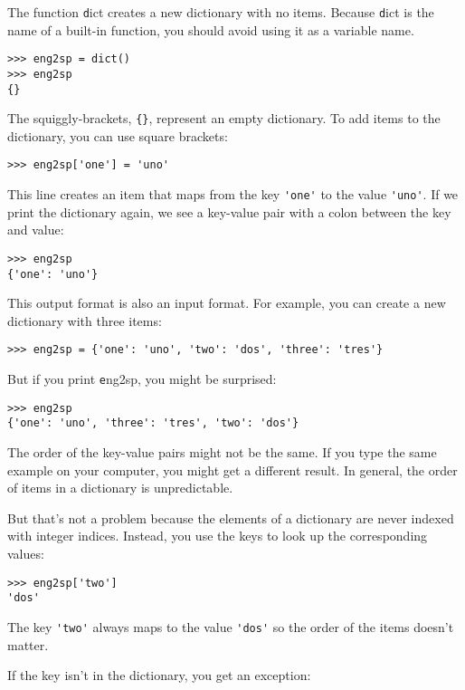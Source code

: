 \documentclass[
DIV=11,
fontsize=13,
twoside,
headinclude=false,
titlepage=firstiscover,
abstract=true,
headsepline=true,
footsepline=true,
chapterprefix=true, %
headings=big,
bibliography=totoc,%
captions=tableheading
]{scrbook}
\theoremstyle{definition}
\begin{document}
The function {\texttt dict} creates a new dictionary with no items.
Because {\texttt dict} is the name of a built-in function, you
should avoid using it as a variable name.

\begin{lstlisting}
>>> eng2sp = dict()
>>> eng2sp
{}
\end{lstlisting}

The squiggly-brackets, \verb"{}", represent an empty dictionary.
To add items to the dictionary, you can use square brackets:

\begin{lstlisting}
>>> eng2sp['one'] = 'uno'
\end{lstlisting}
%
This line creates an item that maps from the key
\verb"'one'" to the value \verb"'uno'".  If we print the
dictionary again, we see a key-value pair with a colon
between the key and value:

\begin{lstlisting}
>>> eng2sp
{'one': 'uno'}
\end{lstlisting}
%
This output format is also an input format.  For example,
you can create a new dictionary with three items:

\begin{lstlisting}
>>> eng2sp = {'one': 'uno', 'two': 'dos', 'three': 'tres'}
\end{lstlisting}
%
But if you print {\texttt eng2sp}, you might be surprised:

\begin{lstlisting}
>>> eng2sp
{'one': 'uno', 'three': 'tres', 'two': 'dos'}
\end{lstlisting}
%
The order of the key-value pairs might not be the same.  If
you type the same example on your computer, you might get a
different result.  In general, the order of items in
a dictionary is unpredictable.

But that's not a problem because
the elements of a dictionary are never indexed with integer indices.
Instead, you use the keys to look up the corresponding values:

\begin{lstlisting}
>>> eng2sp['two']
'dos'
\end{lstlisting}
%
The key \verb"'two'" always maps to the value \verb"'dos'" so the order
of the items doesn't matter.

If the key isn't in the dictionary, you get an exception:
\end{document}
